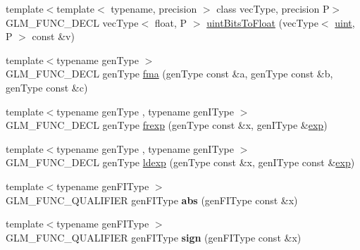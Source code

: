 \begin{DoxyCompactItemize}
\item 
{\footnotesize template$<$template$<$ typename, precision $>$ class vec\-Type, precision P$>$ }\\G\-L\-M\-\_\-\-F\-U\-N\-C\-\_\-\-D\-E\-C\-L vec\-Type$<$ float, P $>$ \hyperlink{group__core__func__common_ga3acab37650ecd792dc84548094b58684}{uint\-Bits\-To\-Float} (vec\-Type$<$ \hyperlink{group__core__precision_ga4fd29415871152bfb5abd588334147c8}{uint}, P $>$ const \&v)
\item 
{\footnotesize template$<$typename gen\-Type $>$ }\\G\-L\-M\-\_\-\-F\-U\-N\-C\-\_\-\-D\-E\-C\-L gen\-Type \hyperlink{group__core__func__common_gad0f444d4b81cc53c3b6edf5aa25078c2}{fma} (gen\-Type const \&a, gen\-Type const \&b, gen\-Type const \&c)
\item 
{\footnotesize template$<$typename gen\-Type , typename gen\-I\-Type $>$ }\\G\-L\-M\-\_\-\-F\-U\-N\-C\-\_\-\-D\-E\-C\-L gen\-Type \hyperlink{group__core__func__common_ga20620e83544d1a988857a3bc4ebe0e1d}{frexp} (gen\-Type const \&x, gen\-I\-Type \&\hyperlink{group__core__func__exponential_gae154699ba6bda068d4b87cf9b987381f}{exp})
\item 
{\footnotesize template$<$typename gen\-Type , typename gen\-I\-Type $>$ }\\G\-L\-M\-\_\-\-F\-U\-N\-C\-\_\-\-D\-E\-C\-L gen\-Type \hyperlink{group__core__func__common_ga52e319d7289b849ec92055abd4830533}{ldexp} (gen\-Type const \&x, gen\-I\-Type const \&\hyperlink{group__core__func__exponential_gae154699ba6bda068d4b87cf9b987381f}{exp})
\item 
\hypertarget{namespaceglm_a5c82b1e2a9cb12b4a70d22a8f987273d}{{\footnotesize template$<$typename gen\-F\-I\-Type $>$ }\\G\-L\-M\-\_\-\-F\-U\-N\-C\-\_\-\-Q\-U\-A\-L\-I\-F\-I\-E\-R gen\-F\-I\-Type {\bfseries abs} (gen\-F\-I\-Type const \&x)}\label{namespaceglm_a5c82b1e2a9cb12b4a70d22a8f987273d}

\item 
\hypertarget{namespaceglm_aaa1babcfcb872aa6bf5e701c20ac4fda}{{\footnotesize template$<$typename gen\-F\-I\-Type $>$ }\\G\-L\-M\-\_\-\-F\-U\-N\-C\-\_\-\-Q\-U\-A\-L\-I\-F\-I\-E\-R gen\-F\-I\-Type {\bfseries sign} (gen\-F\-I\-Type const \&x)}\label{namespaceglm_aaa1babcfcb872aa6bf5e701c20ac4fda}


\end{DoxyCompactItemize}
